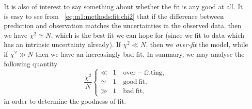     It is also of interest to say something about whether the fit is any good at all. It is easy to see from ~\cref{eq:m1:methods:fit:chi2} that if the difference between prediction and observation matches the uncertainties in the observed data, then we have $\chi^2 \simeq N$, which is the best fit we can hope for (since we fit to data which has an intrinsic uncertainty already). If $\chi^2\ll N$, then we \textit{over-fit} the model, while if $\chi^2\gg N$ then we have an increasingly bad fit. In summary, we may analyse the following quantity
    \begin{equation}\label{eq:m1:fit:goodness_of_fit}
        \frac{\chi^2}{N} \begin{cases}
            \ll &1 \quad \mathrm{over-fitting,} \\
            \simeq &1 \quad \mathrm{good\ fit,}\\
            \gg &1 \quad \mathrm{bad\ fit,}
        \end{cases}
    \end{equation}
    in order to determine the goodness of fit. 


    